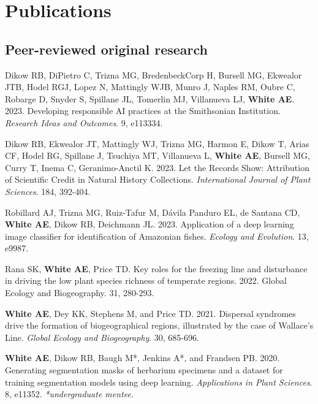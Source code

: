 \documentclass[letterpaper]{article}
\newenvironment{biblist}{%
   \begin{list}{}{%
     \setlength{\labelwidth}{0pt}%
     \setlength{\labelsep}{1em}%
     \setlength{\leftmargin}{2em}%
     \setlength{\itemindent}{-1em}%
   }
}{\end{list}}
\begin{document}
\section*{Publications}
\subsection*{Peer-reviewed original research}
\begin{biblist}
\item Dikow RB, DiPietro C, Trizna MG, BredenbeckCorp H, Bursell MG, Ekwealor JTB, Hodel RGJ, Lopez N, Mattingly WJB, Munro J, Naples RM, Oubre C, Robarge D, Snyder S, Spillane JL, Tomerlin MJ, Villanueva LJ, \textbf{White AE}. 2023. Developing responsible AI practices at the Smithsonian Institution. \textit{Research Ideas and Outcomes}. 9, e113334.

\item Dikow RB, Ekwealor JT, Mattingly WJ, Trizna MG, Harmon E, Dikow T, Arias CF, Hodel RG, Spillane J, Tsuchiya MT, Villanueva L, \textbf{White AE}, Bursell MG, Curry T, Inema C, Geranimo-Anctil K. 2023. Let the Records Show: Attribution of Scientific Credit in Natural History Collections. \textit{International Journal of Plant Sciences}. 184, 392-404.

\item Robillard AJ, Trizna MG, Ruiz‐Tafur M, Dávila Panduro EL, de Santana CD, \textbf{White AE}, Dikow RB, Deichmann JL. 2023. Application of a deep learning image classifier for identification of Amazonian fishes. \textit{Ecology and Evolution}. 13, e9987.

\item Rana SK, \textbf{White AE}, Price TD. Key roles for the freezing line and disturbance in driving the low plant species richness of temperate regions. 2022. Global Ecology and Biogeography. 31, 280-293.

\item \textbf{White AE}, Dey KK, Stephens M, and Price TD. 2021. Dispersal syndromes drive the formation of biogeographical regions, illustrated by the case of Wallace's Line. \textit{Global Ecology and Biogeography}. 30, 685-696.

\item \textbf{White AE}, Dikow RB, Baugh M*, Jenkins A*, and Frandsen PB. 2020. Generating segmentation masks of herbarium specimens and a dataset for training segmentation models using deep learning. \textit{Applications in Plant Sciences}. 8, e11352. \textit{*undergraduate mentee}.


\end{biblist}
\end{document}
